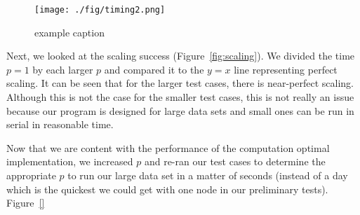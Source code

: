 \begin{figure}[!ht]
   \centering
   \texttt{[image: ./fig/timing2.png]} %
   \caption{example caption}
   \label{fig:comp_timings}
\end{figure}

Next, we looked at the scaling success (Figure~\ref{fig:scaling}). We divided the time $p=1$ by each larger $p$ and compared it to the $y=x$ line representing perfect scaling. It can be seen that for the larger test cases, there is near-perfect scaling. Although this is not the case for the smaller test cases, this is not really an issue because our program is designed for large data sets and small ones can be run in serial in reasonable time. 

Now that we are content with the performance of the computation optimal implementation, we increased $p$ and re-ran our test cases to determine the appropriate $p$ to run our large data set in a matter of seconds (instead of a day which is the quickest we could get with one node in our preliminary tests). Figure~\ref{}
